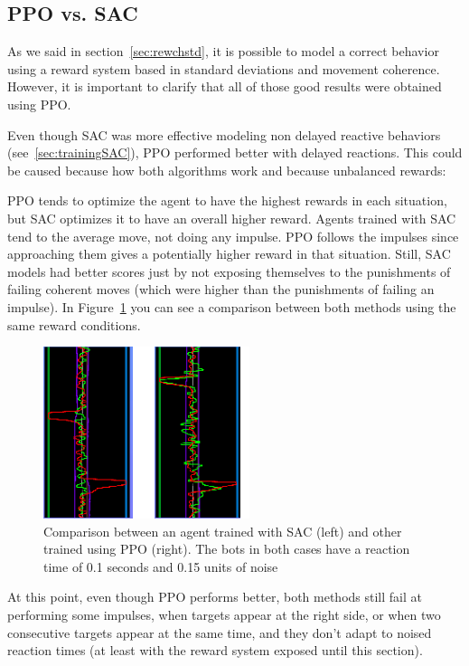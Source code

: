 \subsection{PPO vs. SAC}

As we said in section~\ref{sec:rewchstd}, it is possible to model a correct behavior using a reward system based in standard deviations and movement coherence. However, it is important to clarify that all of those good results were obtained using PPO.

Even though SAC was more effective modeling non delayed reactive behaviors (see~\ref{sec:trainingSAC}), PPO performed better with delayed reactions. This could be caused because how both algorithms work and because unbalanced rewards:

PPO tends to optimize the agent to have the highest rewards in each situation, but SAC optimizes it to have an overall higher reward. Agents trained with SAC tend to the average move, not doing any impulse. PPO follows the impulses since approaching them gives a potentially higher reward in that situation. Still, SAC models had better scores just by not exposing themselves to the punishments of failing coherent moves (which were higher than the punishments of failing an impulse). In Figure~\ref{fig:rtsacppo} you can see a comparison between both methods using the same reward conditions.

\begin{figure}[h]
  \centering
		\includegraphics[width=.6\textwidth]{img/rtSACvsPPO.png}
  \caption{Comparison between an agent trained with SAC (left) and other trained using PPO (right). The bots in both cases have a reaction time of 0.1 seconds and 0.15 units of noise}
  \label{fig:rtsacppo}
\end{figure}

At this point, even though PPO performs better, both methods still fail at performing some impulses, when targets appear at the right side, or when two consecutive targets appear at the same time, and they don't adapt to noised reaction times (at least with the reward system exposed until this section).

